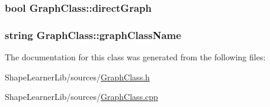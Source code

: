 \subsubsection[{direct\+Graph}]{\setlength{\rightskip}{0pt plus 5cm}bool Graph\+Class\+::direct\+Graph\hspace{0.3cm}{\ttfamily [private]}}\label{class_graph_class_a0a7139786cbd721f044f72d94b72f908}
\hypertarget{class_graph_class_a81face40eb784b7b0535c096839d4285}{}
\subsubsection[{graph\+Class\+Name}]{\setlength{\rightskip}{0pt plus 5cm}string Graph\+Class\+::graph\+Class\+Name\hspace{0.3cm}{\ttfamily [private]}}\label{class_graph_class_a81face40eb784b7b0535c096839d4285}


The documentation for this class was generated from the following files\+:\begin{DoxyCompactItemize}
\item 
Shape\+Learner\+Lib/sources/\hyperlink{_graph_class_8h}{Graph\+Class.\+h}\item 
Shape\+Learner\+Lib/sources/\hyperlink{_graph_class_8cpp}{Graph\+Class.\+cpp}\end{DoxyCompactItemize}
